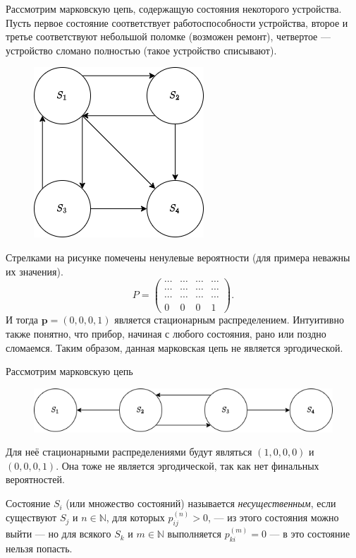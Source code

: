 \begin{ex}
  Рассмотрим марковскую цепь, содержащую состояния некоторого устройства. Пусть первое 
  состояние соответствует работоспособности устройства, второе и третье
  соответствуют небольшой поломке (возможен ремонт),
  четвертое --- устройство сломано полностью (такое устройство списывают).
  \begin{figure}[h!]
    \centering
    \includegraphics[width=0.3\linewidth]{stoproc/Figures/lec2-ex2}
  \end{figure}
  
  Стрелками на рисунке помечены ненулевые вероятности (для примера неважны их
  значения).
  \[
    P = \begin{pmatrix}
      \cdots & \cdots & \cdots & \cdots\\
      \cdots & \cdots & \cdots & \cdots\\
      \cdots & \cdots & \cdots & \cdots \\
      0 & 0 & 0 & 1
    \end{pmatrix}.
  \]
  И тогда $\mathbf p = (0, 0, 0, 1)$ является стационарным распределением.
  Интуитивно также понятно, что прибор, начиная с любого состояния, рано или поздно сломаемся.
  Таким образом, данная марковская цепь не является эргодической.
\end{ex}

\begin{ex}
  Рассмотрим марковскую цепь
  \begin{figure}[h!]
    \centering
    \includegraphics[width=0.7\linewidth]{stoproc/Figures/lec2-ex3}
  \end{figure}
  
  Для неё стационарными распределениями будут являться $(1, 0, 0, 0)$
  и $(0, 0, 0, 1)$. Она тоже не является эргодической, так как нет финальных
  вероятностей.
\end{ex}

\begin{definition}
  Состояние $S_i$ (или множество состояний) называется \emph{несущественным}, если
  существуют $ S_j $ и $ n\in \mathbb N $, для которых $p_{ij}^{(n)} > 0$, --- из
  этого состояния можно выйти ---
  но для всякого $ S_k $ и $ m \in \mathbb N $ выполняется $p_{ki}^{(m)} = 0$ --- в это состояние нельзя попасть.
\end{definition}

